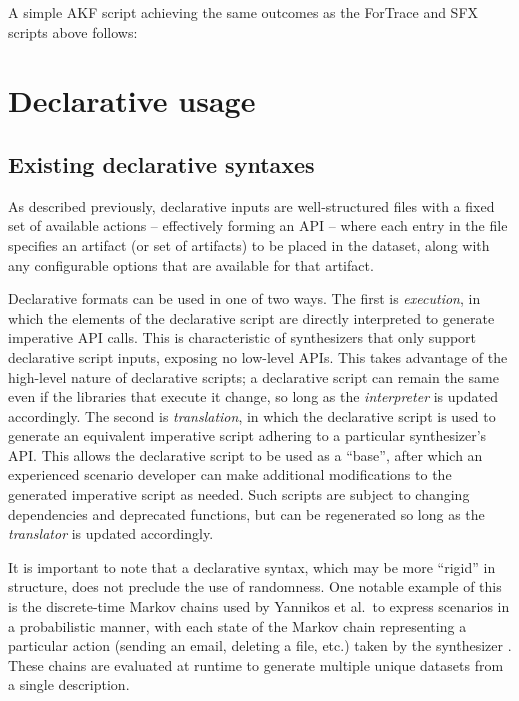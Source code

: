 \documentclass[letterpaper,12pt]{report}
\begin{document}
A simple AKF script achieving the same outcomes as the ForTrace and SFX
scripts above follows:

\section{Declarative usage}\label{declarative-usage}

\subsection{Existing declarative
syntaxes}\label{existing-declarative-syntaxes}

As described previously, declarative inputs are well-structured files
with a fixed set of available actions -- effectively forming an API --
where each entry in the file specifies an artifact (or set of artifacts)
to be placed in the dataset, along with any configurable options that
are available for that artifact.

Declarative formats can be used in one of two ways. The first is
\emph{execution}, in which the elements of the declarative script are
directly interpreted to generate imperative API calls. This is
characteristic of synthesizers that only support declarative script
inputs, exposing no low-level APIs. This takes advantage of the
high-level nature of declarative scripts; a declarative script can
remain the same even if the libraries that execute it change, so long as
the \emph{interpreter} is updated accordingly. The second is
\emph{translation}, in which the declarative script is used to generate
an equivalent imperative script adhering to a particular synthesizer's
API. This allows the declarative script to be used as a ``base'', after
which an experienced scenario developer can make additional
modifications to the generated imperative script as needed. Such scripts
are subject to changing dependencies and deprecated functions, but can
be regenerated so long as the \emph{translator} is updated accordingly.

It is important to note that a declarative syntax, which may be more
``rigid'' in structure, does not preclude the use of randomness. One
notable example of this is the discrete-time Markov chains used by
Yannikos et al.~to express scenarios in a probabilistic manner, with
each state of the Markov chain representing a particular action (sending
an email, deleting a file, etc.) taken by the synthesizer
\cite{yannikosDataCorporaDigital2014}. These chains are evaluated at
runtime to generate multiple unique datasets from a single description.
\end{document}
